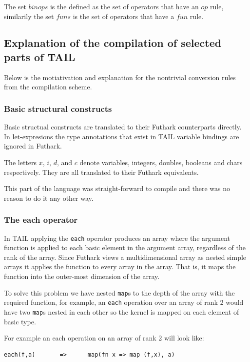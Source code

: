 \documentclass[11pt]{article}
\begin{document}
The set $binops$ is the defined as the set of operators that have an $op$ rule, similarily the set $funs$ is the set of
operators that have a $fun$ rule.

\subsection{Explanation of the compilation of selected parts of TAIL}
Below is the motiativation and explanation for the nontrivial conversion rules from the compilation scheme. 

\subsubsection{Basic structural constructs} 
Basic structual constructs are translated to their Futhark counterparts directly.
In let-expresions the type annotations that exist in TAIL variable bindings are ignored in Futhark. 

The letters $x$, $i$, $d$, and $c$ denote variables, integers, doubles, booleans and chars respectively.
They are all translated to their Futhark equivalents.

This part of the language was straight-forward to compile and there was no reason to do it any other way.

\subsubsection{The each operator} 

In TAIL applying the {\tt each} operator produces an array where the argument function is applied to each basic element in the
argument array, regardless of the rank of the array.
Since Futhark views a multidimensional array as nested simple arrays it applies the function to every array in the array.
That is, it maps the function into the outer-most dimension of the array\cite{TroelsHenriksen}.
 
To solve this problem we have nested {\tt map}s to the depth of the array with the required function,
for example, an {\tt each} operation over an array of rank 2 would have two {\tt map}s nested in each other so the kernel is
mapped on each element of basic type.
 
For example an each operation on an array of rank 2 will look like:
\begin{lstlisting}[numbers=none,frame=none]
each(f,a)       =>      map(fn x => map (f,x), a)
\end{lstlisting}
\end{document}
